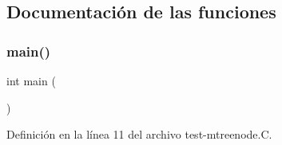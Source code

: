 \subsection{Documentación de las funciones}
\mbox{\label{test-mtreenode_8_c_ae66f6b31b5ad750f1fe042a706a4e3d4}} 
\subsubsection{\texorpdfstring{main()}{main()}}
{\footnotesize\ttfamily int main (\begin{DoxyParamCaption}{ }\end{DoxyParamCaption})}



Definición en la línea 11 del archivo test-\/mtreenode.\+C.

